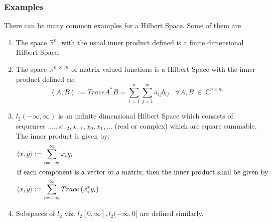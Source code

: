 \documentclass[a4paper,12pt]{article}
\begin{document}
		\subsubsection{Examples} There can be many common examples for a Hilbert Space. Some of them are
			\begin{enumerate}
				\item The space $\mathbb{R}^{n}$, with the usual inner product defined is a finite dimensional Hilbert Space.
				\item The space $\mathbb{R}^{n\:\times\:m}$ of matrix valued functions is a Hilbert Space with the inner product defined as:
					\begin{equation*}
						\left\langle A, B \right\rangle := Trace A^{*}B = \sum\limits_{i=1}^n \sum\limits_{j=1}^m \bar{a_{ij}}b_{ij} \:\:\:\: \forall A,B \:\in \:\mathbb{C}^{n \times m}
					\end{equation*}
				\item $l_{2}(-\infty,\infty)$ is an infinite dimensional Hilbert Space which consists of sequences ${....,x_{-2},x_{-1},x_{0},x_{1},...}$ (real or complex) which are square summable. The inner product is given by:
					\begin{align*}
						\left\langle x, y \right\rangle &:= \sum\limits_{i=-\infty}^\infty \bar{x_{i}}y_{i}\\
						\intertext{If each component is a vector or a matrix, then the inner product shall be given by}
						\left\langle x, y \right\rangle &:= \sum\limits_{i=-\infty}^\infty Trace \: (x_{i}^{*}y_{i})\\						
					\end{align*}
				\item Subspaces of $l_{2}$ viz. $l_{2}[0,\infty],l_{2}(-\infty,0]$ are defined similarly.
					
			\end{enumerate}
\end{document}

